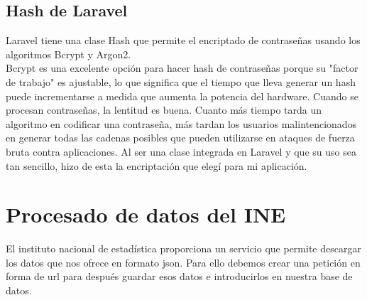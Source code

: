 \subsection{Hash de Laravel}
Laravel tiene una clase Hash que permite el encriptado de contraseñas usando los algoritmos Bcrypt y Argon2.\\
Bcrypt es una excelente opción para hacer hash de contraseñas porque su "factor de trabajo" es ajustable, lo que significa que el tiempo que lleva generar un hash puede incrementarse a medida que aumenta la potencia del hardware. Cuando se procesan contraseñas, la lentitud es buena. Cuanto más tiempo tarda un algoritmo en codificar una contraseña, más tardan los usuarios malintencionados en generar todas las cadenas posibles que pueden utilizarse en ataques de fuerza bruta contra aplicaciones.\cite{HashLaravel}
Al ser una clase integrada en Laravel y que su uso sea tan sencillo, hizo de esta la encriptación que elegí para mi aplicación.
 \section{Procesado de datos del INE}
El instituto nacional de estadística proporciona un servicio que permite descargar los datos que nos ofrece en formato json. Para ello debemos crear una petición en forma de url para después guardar esos datos e introducirlos en nuestra base de datos.
